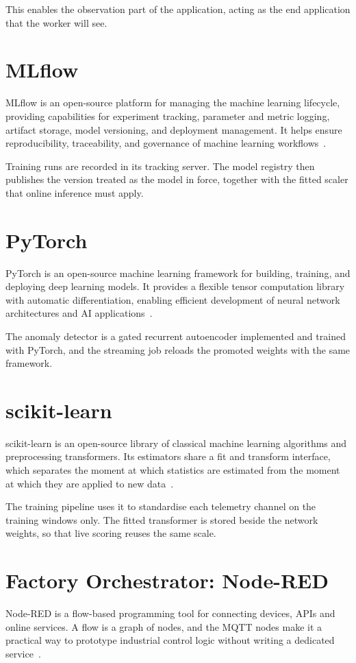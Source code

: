 This enables the observation part of the application, acting as the end application that the worker will see.

\section{MLflow}
MLflow is an open-source platform for managing the machine learning lifecycle, providing capabilities for experiment tracking, parameter and metric logging, artifact storage, model versioning, and deployment management.
It helps ensure reproducibility, traceability, and governance of machine learning workflows~\cite{mlflow}.

Training runs are recorded in its tracking server. The model registry then publishes the version treated as the model in force, together with the fitted scaler that online inference must apply.

\section{PyTorch}
PyTorch is an open-source machine learning framework for building, training, and deploying deep learning models.
It provides a flexible tensor computation library with automatic differentiation, enabling efficient development of neural network architectures and AI applications~\cite{pytorch}.

The anomaly detector is a gated recurrent autoencoder implemented and trained with PyTorch, and the streaming job reloads the promoted weights with the same framework.

\section{scikit-learn}
scikit-learn is an open-source library of classical machine learning algorithms and preprocessing transformers. Its estimators share a fit and transform interface, which separates the moment at which statistics are estimated from the moment at which they are applied to new data~\cite{scikit-learn}.

The training pipeline uses it to standardise each telemetry channel on the training windows only. The fitted transformer is stored beside the network weights, so that live scoring reuses the same scale.

\section{Factory Orchestrator: Node-RED}
Node-RED is a flow-based programming tool for connecting devices, APIs and online services. A flow is a graph of nodes, and the MQTT nodes make it a practical way to prototype industrial control logic without writing a dedicated service~\cite{nodered}.

